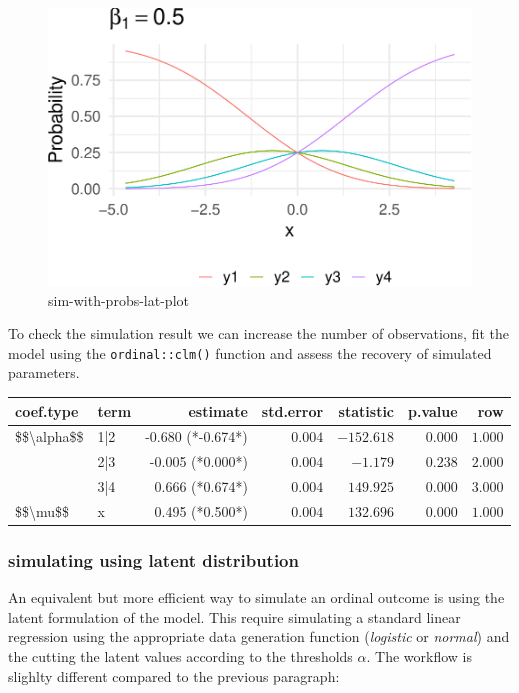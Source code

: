 \documentclass[
  man,floatsintext]{apa6}
\begin{document}
\begin{figure}

{\centering \includegraphics{paper-new_files/figure-latex/sim-with-probs-lat-plot-1} 

}

\caption{sim-with-probs-lat-plot}\label{fig:sim-with-probs-lat-plot}
\end{figure}

To check the simulation result we can increase the number of observations, fit the model using the \texttt{ordinal::clm()} function and assess the recovery of simulated parameters.

\begin{longtable}{llrrrrr}
\toprule
coef.type & term & estimate & std.error & statistic & p.value & row \\ 
\midrule
\$\$\textbackslash{}alpha\$\$ & 1|2 & -0.680 (*-0.674*) & $0.004$ & $-152.618$ & $0.000$ & $1.000$ \\ 
 & 2|3 & -0.005 (*0.000*) & $0.004$ & $-1.179$ & $0.238$ & $2.000$ \\ 
 & 3|4 & 0.666 (*0.674*) & $0.004$ & $149.925$ & $0.000$ & $3.000$ \\ 
\$\$\textbackslash{}mu\$\$ & x & 0.495 (*0.500*) & $0.004$ & $132.696$ & $0.000$ & $1.000$ \\ 
\bottomrule
\end{longtable}

\subsubsection{simulating using latent distribution}\label{simulating-using-latent-distribution}

An equivalent but more efficient way to simulate an ordinal outcome is using the latent formulation of the model. This require simulating a standard linear regression using the appropriate data generation function (\emph{logistic} or \emph{normal}) and the cutting the latent values according to the thresholds \(\alpha\). The workflow is slighlty different compared to the previous paragraph:
\end{document}

